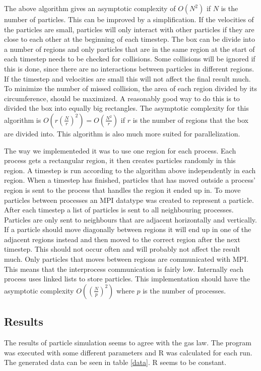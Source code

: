 \documentclass[a4paper,11pt]{article}
\begin{document}
The above algorithm gives an asymptotic complexity of $O(N^2)$ if $N$ is the number of particles.
This can be improved by a simplification.
If the velocities of the particles are small, particles will only interact with other particles if they are close to each other at the beginning of each timestep.
The box can be divide into a number of regions and only particles that are in the same region at the start of each timestep needs to be checked for collisions.
Some collisions will be ignored if this is done, since there are no interactions between particles in different regions.
If the timestep and velocities are small this will not affect the final result much.
To minimize the number of missed collision, the area of each region divided by its circumference, should be maximized.
A reasonably good way to do this is to divided the box into equally big rectangles.
The asymptotic complexity for this algorithm is $O(r(\frac{N}{r})^2) = O(\frac{N^2}{r})$ if $r$ is the number of regions that the box are divided into.
This algorithm is also much more suited for parallelization.

The way we implementeded it was to use one region for each process.
Each process gets a rectangular region, it then creates particles randomly in this region.
A timestep is run according to the algorithm above independently in each region.
When a timestep has finished, particles that has moved outside a process' region is sent to the process that handles the region it ended up in.
To move particles between processes an MPI datatype was created to represent a particle.
After each timestep a list of particles is sent to all neighbouring processes.
Particles are only sent to neighbours that are adjacent horizontally and vertically.
If a particle should move diagonally between regions it will end up in one of the adjacent regions instead and then moved to the correct region after the next timestep.
This should not occur often and will probably not affect the result much.
Only particles that moves between regions are communicated with MPI.
This means that the interprocess communication is fairly low.
Internally each process uses linked lists to store particles.
This implementation should have the asymptotic complexity $O((\frac{N}{p})^2)$ where $p$ is the number of processes.

\subsection{Results}
The results of particle simulation seems to agree with the gas law.
The program was executed with some different parameters and R was calculated for each run.
The generated data can be seen in table \ref{data}.
R seems to be constant.
\end{document}
